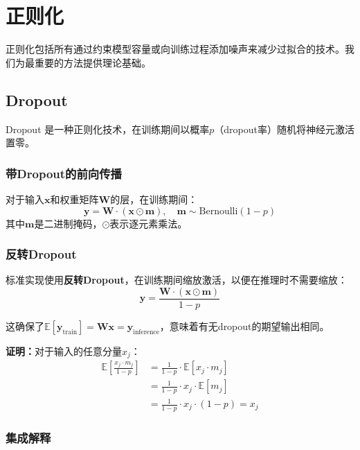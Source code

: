 \section{正则化}

正则化包括所有通过约束模型容量或向训练过程添加噪声来减少过拟合的技术。我们为最重要的方法提供理论基础。

\subsection{Dropout}
\label{sec:dropout_theory}

Dropout \cite{srivastava2014dropout}是一种正则化技术，在训练期间以概率$p$（dropout率）随机将神经元激活置零。

\subsubsection{带Dropout的前向传播}

对于输入$\mathbf{x}$和权重矩阵$\mathbf{W}$的层，在训练期间：
\begin{equation}
\mathbf{y} = \mathbf{W} \cdot (\mathbf{x} \odot \mathbf{m}), \quad \mathbf{m} \sim \text{Bernoulli}(1 - p)
\end{equation}
其中$\mathbf{m}$是二进制掩码，$\odot$表示逐元素乘法。

\subsubsection{反转Dropout}

标准实现使用\textbf{反转Dropout}，在训练期间缩放激活，以便在推理时不需要缩放：
\begin{equation}
\mathbf{y} = \frac{\mathbf{W} \cdot (\mathbf{x} \odot \mathbf{m})}{1 - p}
\end{equation}

这确保了$\mathbb{E}[\mathbf{y}_{\text{train}}] = \mathbf{W}\mathbf{x} = \mathbf{y}_{\text{inference}}$，意味着有无dropout的期望输出相同。

\textbf{证明：}对于输入的任意分量$x_j$：
\begin{align}
\mathbb{E}\left[\frac{x_j \cdot m_j}{1 - p}\right] &= \frac{1}{1-p} \cdot \mathbb{E}[x_j \cdot m_j] \\
&= \frac{1}{1-p} \cdot x_j \cdot \mathbb{E}[m_j] \\
&= \frac{1}{1-p} \cdot x_j \cdot (1 - p) = x_j
\end{align}

\subsubsection{集成解释}

